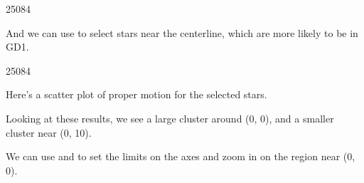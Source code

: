 \documentclass[letterpaper,10pt,english]{sphinxmanual}
\begin{document}
\begin{sphinxVerbatim}[commandchars=\\\{\}]
25084
\end{sphinxVerbatim}

And we can use  to select stars near the centerline, which are more likely to be in GD\sphinxhyphen{}1.

\begin{sphinxVerbatim}[commandchars=\\\{\}]
  \PYG{p}{[}\PYG{p}{]}
\end{sphinxVerbatim}

\begin{sphinxVerbatim}[commandchars=\\\{\}]
25084
\end{sphinxVerbatim}

Here’s a scatter plot of proper motion for the selected stars.

\begin{sphinxVerbatim}[commandchars=\\\{\}]
  \PYG{p}{[}\PYG{p}{]}
  \PYG{p}{[}\PYG{p}{]}

    
    
\end{sphinxVerbatim}

\noindent{}

Looking at these results, we see a large cluster around (0, 0), and a smaller cluster near (0, \sphinxhyphen{}10).

We can use  and  to set the limits on the axes and zoom in on the region near (0, 0).
\end{document}
